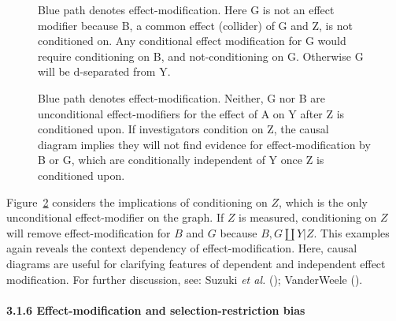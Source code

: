 \documentclass[
  singlecolumn]{article}
\let\oldparagraph\paragraph
\renewcommand{\paragraph}[1]{\oldparagraph{#1}\mbox{}}
\begin{document}
\begin{figure}


\caption{\label{fig-dag-effect-modification-5b}Blue path denotes
effect-modification. Here G is not an effect modifier because B, a
common effect (collider) of G and Z, is not conditioned on. Any
conditional effect modification for G would require conditioning on B,
and not-conditioning on G. Otherwise G will be d-separated from Y.}

\end{figure}%

\begin{figure}


\caption{\label{fig-dag-effect-modification-5c}Blue path denotes
effect-modification. Neither, G nor B are unconditional effect-modifiers
for the effect of A on Y after Z is conditioned upon. If investigators
condition on Z, the causal diagram implies they will not find evidence
for effect-modification by B or G, which are conditionally independent
of Y once Z is conditioned upon.}

\end{figure}%

Figure~\ref{fig-dag-effect-modification-5c} considers the implications
of conditioning on \(Z\), which is the only unconditional
effect-modifier on the graph. If \(Z\) is measured, conditioning on
\(Z\) will remove effect-modification for \(B\) and \(G\) because
\(B,G\coprod Y |Z\). This examples again reveals the context dependency
of effect-modification. Here, causal diagrams are useful for clarifying
features of dependent and independent effect modification. For further
discussion, see: Suzuki \emph{et al.}
(); VanderWeele
().

\paragraph{3.1.6 Effect-modification and selection-restriction
bias}\label{effect-modification-and-selection-restriction-bias}
\end{document}
